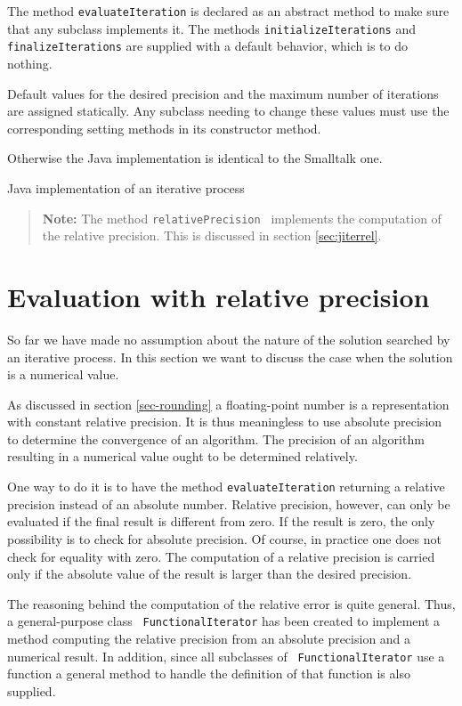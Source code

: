 \documentclass[twoside]{book}
\begin{document}
The method {\tt evaluateIteration} is declared as an abstract
method to make sure that any subclass implements it. The methods
{\tt initializeIterations} and {\tt finalizeIterations} are
supplied with a default behavior, which is to do nothing.

Default values for the desired precision and the maximum number of
iterations are assigned statically. Any subclass needing to change
these values must use the corresponding setting methods in its
constructor method.

Otherwise the Java implementation is identical to the Smalltalk
one.
\begin{listing} Java implementation of an iterative process \label{lj:iteration}

\end{listing}
\begin{quote}
{\bf Note:} The method {\tt relativePrecision } implements the
computation of the relative precision. This is discussed in
section \ref{sec:jiterrel}.
\end{quote}

\section{Evaluation with relative precision}
\label{sec:iterrel} So far we have made no
assumption about the nature of the solution searched by an
iterative process. In this section we want to discuss the case
when the solution is a numerical value.

As discussed in section \ref{sec-rounding} a floating-point number
is a representation with constant relative precision. It is thus
meaningless to use absolute precision to determine the convergence
of an algorithm. The precision of an algorithm resulting in a
numerical value ought to be determined relatively.

One way to do it is to have the method {\tt evaluateIteration}
returning a relative precision instead of an absolute number.
Relative precision, however, can only be evaluated if the final
result is different from zero. If the result is zero, the only
possibility is to check for absolute precision. Of course, in
practice one does not check for equality with zero. The
computation of a relative precision is carried only if the
absolute value of the result is larger than the desired precision.

The reasoning behind the computation of the relative error is
quite general. Thus, a general-purpose class {\tt
FunctionalIterator} has been created to implement a method
computing the relative precision from an absolute precision and a
numerical result. In addition, since all subclasses of {\tt
FunctionalIterator} use a function a general method to handle the
definition of that function is also supplied.
\end{document}

